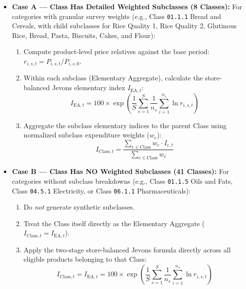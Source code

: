 \begin{itemize}
    \item \textbf{Case A --- Class Has Detailed Weighted Subclasses (8 Classes):}
    For categories with granular survey weights (e.g., Class \texttt{01.1.1} Bread and Cereals, with child subclasses for Rice Quality 1, Rice Quality 2, Glutinous Rice, Bread, Pasta, Biscuits, Cakes, and Flour):
    \begin{enumerate}
        \item Compute product-level price relatives against the base period: $r_{i, s, t} = P_{i, s, t} / P_{i, s, 0}$.
        \item Within each subclass (Elementary Aggregate), calculate the store-balanced Jevons elementary index $I_{\text{EA}, t}$:
        \begin{equation}
            I_{\text{EA}, t} = 100 \times \exp\left( \frac{1}{S} \sum_{s=1}^S \frac{1}{n_s} \sum_{i=1}^{n_s} \ln r_{i, s, t} \right)
        \end{equation}
        \item Aggregate the subclass elementary indices to the parent Class using normalized subclass expenditure weights ($w_e$):
        \begin{equation}
            I_{\text{Class}, t} = \frac{\sum_{e \in \text{Class}} w_e \cdot I_{e, t}}{\sum_{e \in \text{Class}} w_e}
        \end{equation}
    \end{enumerate}

    \item \textbf{Case B --- Class Has NO Weighted Subclasses (41 Classes):}
    For categories without subclass breakdowns (e.g., Class \texttt{01.1.5} Oils and Fats, Class \texttt{04.5.1} Electricity, or Class \texttt{06.1.1} Pharmaceuticals):
    \begin{enumerate}
        \item Do \textit{not} generate synthetic subclasses.
        \item Treat the Class itself directly as the Elementary Aggregate ($I_{\text{Class}, t} = I_{\text{EA}, t}$).
        \item Apply the two-stage store-balanced Jevons formula directly across all eligible products belonging to that Class:
        \begin{equation}
            I_{\text{Class}, t} = I_{\text{EA}, t} = 100 \times \exp\left( \frac{1}{S} \sum_{s=1}^S \frac{1}{n_s} \sum_{i=1}^{n_s} \ln r_{i, s, t} \right)
        \end{equation}
    \end{enumerate}
\end{itemize}

